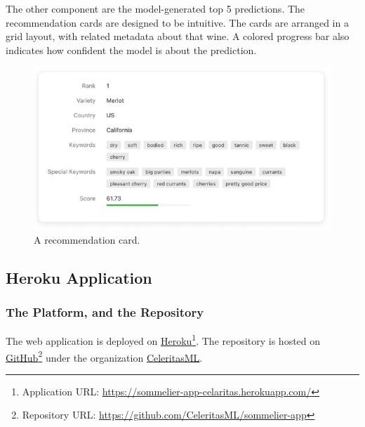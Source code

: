 \documentclass[
	a4paper,
	fontsize=10pt, %
	twoside=false, %
	secnumdepth=2, %
]{kaohandt}
\begin{document}
The other component are the model-generated top 5 predictions. The recommendation cards are designed to be intuitive. The cards are arranged in a grid layout, with related metadata about that wine. A colored progress bar also indicates how confident the model is about the prediction.

\begin{figure}[h]
	\includegraphics[]{sommelier-view-04.jpg}
	\caption{A recommendation card.}
	\label{fig:app_rec_card}
\end{figure}

\subsection{Heroku Application}

\subsubsection{The Platform, and the Repository}

The web application is deployed on \href{https://www.heroku.com/}{Heroku}\footnote{Application URL: \href{https://sommelier-app-celaritas.herokuapp.com/}{https://sommelier-app-celaritas.herokuapp.com/}}. The repository is hosted on \href{https://github.com/CeleritasML/sommelier-app}{GitHub}\footnote{Repository URL: \href{https://github.com/CeleritasML/sommelier-app}{https://github.com/CeleritasML/sommelier-app}} under the organization \href{https://github.com/CeleritasML}{CeleritasML}.
\end{document}
